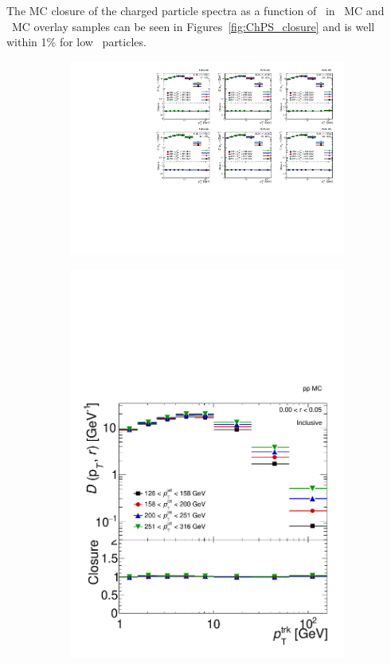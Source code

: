The MC closure of the charged particle spectra as a function of \pt\ in \pp\ MC and \pbpb\ MC overlay samples can be seen in Figures~\ref{fig:ChPS_closure} and is well within 1\% for low \pt\ particles.


\begin{figure}
\begin{subfigure}{0.7\textwidth}
\centering
\includegraphics[page=5, width=1\textwidth]{figures/main/corrections/ChPS_final_PbPb_MC.pdf}
\caption{}
\label{fig:PbPb_ChPS_closure}
\end{subfigure} 
\begin{subfigure}{0.30\textwidth}
\centering
\includegraphics[page=5, width=1\textwidth]{figures/main/corrections/ChPS_final_pp_MC.pdf}

\end{subfigure}
\end{figure}
